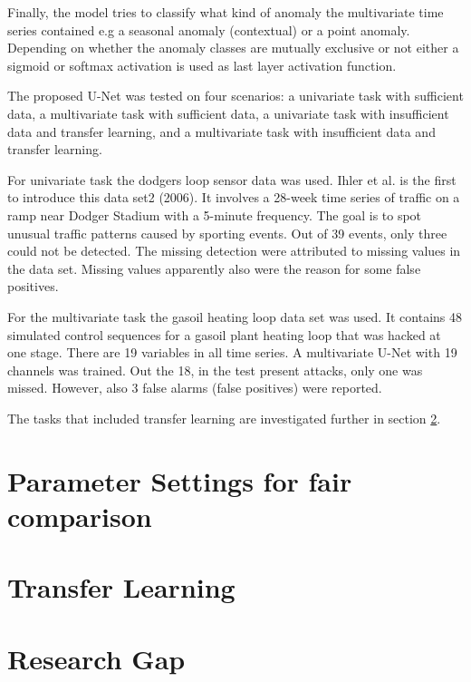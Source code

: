 Finally, the model tries to classify what kind of anomaly the multivariate time series contained e.g a seasonal anomaly (contextual) or a point anomaly. Depending on whether the anomaly classes are mutually exclusive or not either a sigmoid or softmax activation is used as last layer activation function.

The proposed U-Net was tested on four scenarios: a univariate task with sufficient data, a multivariate task with sufficient
data, a univariate task with insufficient data and transfer learning, and a multivariate task with insufficient data and transfer
learning. 

For univariate task the dodgers loop sensor data was used. Ihler et al. is the first to introduce this data set2 (2006). It involves a 28-week time series of traffic on a ramp near Dodger Stadium with a 5-minute frequency. The goal is to spot unusual traffic patterns caused by sporting events. Out of 39 events, only three could not be detected. The missing detection were attributed to missing values in the data set. Missing values apparently also were the reason for some false positives.

For the multivariate task the gasoil heating loop data set was used. It contains 48 simulated control sequences for a gasoil plant heating loop that was hacked at one stage. There are 19 variables in all time series. A multivariate U-Net with 19 channels was trained. Out the 18, in the test present attacks, only one was missed. However, also 3 false alarms (false positives) were reported. 

The tasks that included transfer learning are investigated further in section \ref{TransferLearning}.


\section{Parameter Settings for fair comparison}

\section{Transfer Learning} \label{TransferLearning}

\section{Research Gap}
